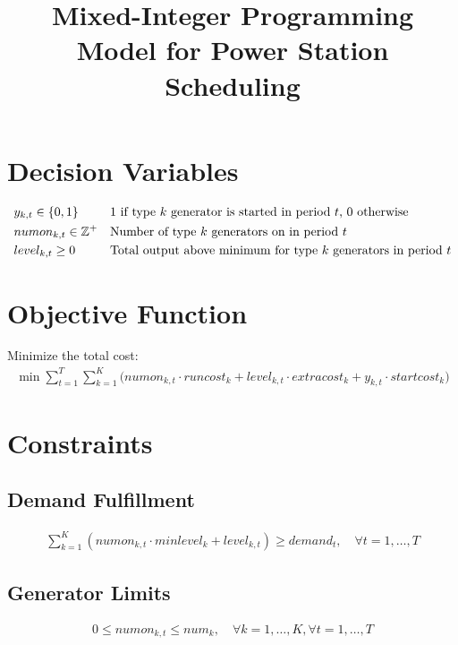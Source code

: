 \documentclass{article}
\begin{document}
\title{Mixed-Integer Programming Model for Power Station Scheduling}
\date{}
\maketitle

\section*{Decision Variables}
\begin{align*}
    & y_{k,t} \in \{0, 1\} && \text{1 if type \( k \) generator is started in period \( t \), 0 otherwise} \\
    & numon_{k,t} \in \mathbb{Z}^+ && \text{Number of type \( k \) generators on in period \( t \)} \\
    & level_{k,t} \geq 0 && \text{Total output above minimum for type \( k \) generators in period \( t \)}
\end{align*}

\section*{Objective Function}
Minimize the total cost:
\begin{align*}
    \min \sum_{t=1}^{T} \sum_{k=1}^{K} \Bigg( numon_{k,t} \cdot runcost_k + level_{k,t} \cdot extracost_k + y_{k,t} \cdot startcost_k \Bigg)
\end{align*}

\section*{Constraints}
\subsection*{Demand Fulfillment}
\begin{align*}
    \sum_{k=1}^{K} \left( numon_{k,t} \cdot minlevel_k + level_{k,t} \right) \geq demand_t, \quad \forall t = 1, \ldots, T
\end{align*}

\subsection*{Generator Limits}
\begin{align*}
    0 \leq numon_{k,t} \leq num_k, \quad \forall k = 1, \ldots, K, \forall t = 1, \ldots, T
\end{align*}
\end{document}
